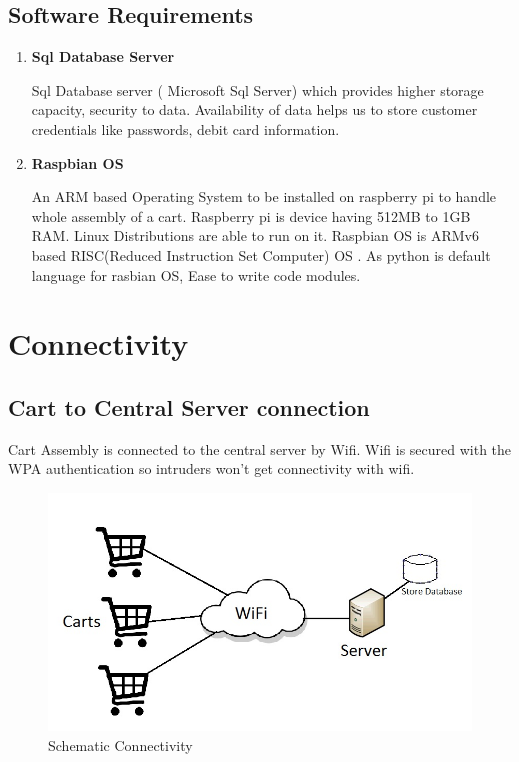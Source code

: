 \documentclass[a4paper,oneside,11pt,english]{report}
\begin{document}
	\subsection{Software Requirements}
		\begin{enumerate}
			\item {
				\textbf{Sql Database Server}
				\par Sql Database server ( Microsoft Sql Server) which provides higher storage capacity, security to data. Availability of data helps us to store customer credentials like passwords, debit card information.
			}
			\item {
				\textbf{Raspbian OS}
				\par An ARM based Operating System to be installed on raspberry pi to handle whole assembly of a cart. Raspberry pi is device having 512MB to 1GB RAM. Linux Distributions are able to run on it. Raspbian OS is ARMv6 based RISC(Reduced Instruction Set Computer) OS . As python is default language for rasbian OS, Ease to write code modules.
			}
		\end{enumerate}
\section{Connectivity}
	\subsection{Cart to Central Server connection}
	\par Cart Assembly is connected to the central server by Wifi. Wifi is secured with the WPA authentication so intruders won't get connectivity with wifi.\\
	\begin{figure}[ht]
		\includegraphics[width=\linewidth]{images/connection1.jpg}
		\caption{Schematic Connectivity}
	\end{figure}
\end{document}
